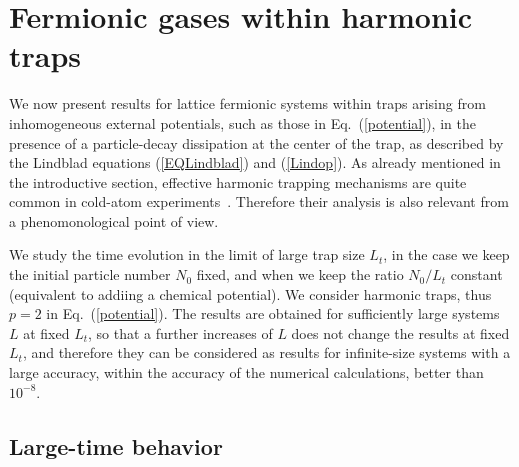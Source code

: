   
  
  \section{Fermionic gases within harmonic traps}
  \label{hartra}
  
  
  We now present results for lattice fermionic systems within traps
  arising from inhomogeneous external potentials, such as those in
  Eq.~(\ref{potential}), in the presence of a particle-decay dissipation
  at the center of the trap, as described by the Lindblad equations
  (\ref{EQLindblad}) and (\ref{Lindop}). As already mentioned in
    the introductive section, effective harmonic trapping mechanisms are
    quite common in cold-atom experiments~\cite{BDZ-08}. Therefore their
    analysis is also relevant from a phenomonological point of view.
  
  We study the time evolution in the limit of large trap size $L_t$, in
  the case we keep the initial particle number $N_0$ fixed, and when we
  keep the ratio $N_0/L_t$ constant (equivalent to addiing a chemical
  potential). We consider harmonic traps, thus $p=2$ in
  Eq.~(\ref{potential}). The results are obtained for sufficiently large
  systems $L$ at fixed $L_t$, so that a further increases of $L$ does
  not change the results at fixed $L_t$, and therefore they can be
  considered as results for infinite-size systems with a large accuracy,
  within the accuracy of the numerical calculations, better than
  $10^{-8}$.
  
  
  \subsection{Large-time behavior}
  \label{asytrap}
  
